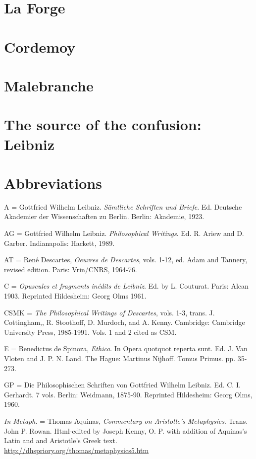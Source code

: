 \section{La Forge}
\section{Cordemoy}
\section{Malebranche}
\section{The source of the confusion: Leibniz}
\section{Abbreviations}

A = Gottfried Wilhelm Leibniz. \emph{Sämtliche Schriften und Briefe}.
Ed. Deutsche Akademier der Wissenschaften zu Berlin. Berlin: Akademie,
1923.

AG = Gottfried Wilhelm Leibniz. \emph{Philosophical Writings}. Ed. R.
Ariew and D. Garber. Indianapolis: Hackett, 1989.

AT = René Descartes, \emph{Oeuvres de Descartes}, vols. 1-12, ed. Adam
and Tannery, revised edition. Paris: Vrin/CNRS, 1964-76.

C = \emph{Opuscules et fragments inédits de Leibniz}. Ed. by L.
Couturat. Paris: Alcan 1903. Reprinted Hildesheim: Georg Olms 1961.

CSMK = \emph{The Philosophical Writings of Descartes}, vols. 1-3, trans.
J. Cottingham,, R. Stoothoff, D. Murdoch, and A. Kenny. Cambridge:
Cambridge University Press, 1985-1991. Vols. 1 and 2 cited as CSM.

E = Benedictus de Spinoza, \emph{Ethica}. In Opera quotquot reperta
sunt. Ed. J. Van Vloten and J. P. N. Land. The Hague: Martinus Nijhoff.
Tomus Primus. pp. 35-273.

GP = Die Philosophischen Schriften von Gottfried Wilhelm Leibniz. Ed. C.
I. Gerhardt. 7 vols. Berlin: Weidmann, 1875-90. Reprinted Hildesheim:
Georg Olms, 1960.

\emph{In Metaph.} = Thomas Aquinas, \emph{Commentary on Aristotle's
	Metaphysics}. Trans. John P. Rowan. Html-edited by Joseph Kenny, O. P.
with addition of Aquinas's Latin and and Aristotle's Greek text.
\url{http://dhspriory.org/thomas/metaphysics5.htm}

